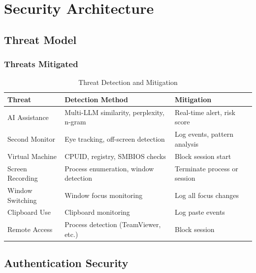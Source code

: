 \documentclass[11pt,letterpaper]{article}
\begin{document}

\section{Security Architecture}

\subsection{Threat Model}

\subsubsection{Threats Mitigated}

\begin{table}[H]
\centering
\small
\begin{tabularx}{\textwidth}{lXX}
\toprule
\textbf{Threat} & \textbf{Detection Method} & \textbf{Mitigation} \\
\midrule
AI Assistance & Multi-LLM similarity, perplexity, n-gram & Real-time alert, risk score \\
Second Monitor & Eye tracking, off-screen detection & Log events, pattern analysis \\
Virtual Machine & CPUID, registry, SMBIOS checks & Block session start \\
Screen Recording & Process enumeration, window detection & Terminate process or session \\
Window Switching & Window focus monitoring & Log all focus changes \\
Clipboard Use & Clipboard monitoring & Log paste events \\
Remote Access & Process detection (TeamViewer, etc.) & Block session \\
\bottomrule
\end{tabularx}
\caption{Threat Detection and Mitigation}
\end{table}

\subsection{Authentication Security}
\end{document}
